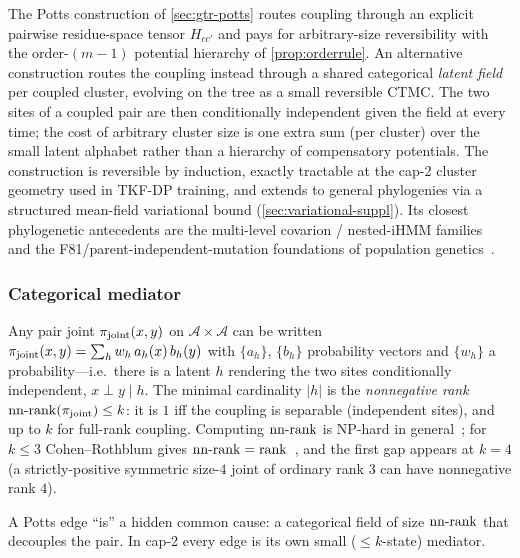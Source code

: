 The Potts construction of \autoref{sec:gtr-potts} routes coupling
through an explicit pairwise residue-space tensor $H_{cc'}$ and pays
for arbitrary-size reversibility with the order-$(m-1)$ potential
hierarchy of \autoref{prop:orderrule}. An alternative construction
routes the coupling instead through a shared categorical
\emph{latent field} per coupled cluster, evolving on the tree as a
small reversible CTMC. The two sites of a coupled pair are then
conditionally independent given the field at every time; the cost
of arbitrary cluster size is one extra sum (per cluster) over the
small latent alphabet rather than a hierarchy of compensatory
potentials. The construction is reversible by induction, exactly
tractable at the cap-2 cluster geometry used in TKF-DP training,
and extends to general phylogenies via a structured mean-field
variational bound (\autoref{sec:variational-suppl}). Its closest
phylogenetic antecedents are the multi-level covarion / nested-iHMM
families~\citep{tuffleysteel1998, Beal2002, TehJordanBealBlei2006}
and the F81/parent-independent-mutation foundations of population
genetics~\citep{ewens1972, Kingman1975, Felsenstein81}.

\subsubsection{Categorical mediator}
\label{sec:dynamic-mediator}

\begin{proposition}
\label{prop:mediator}
Any pair joint $\pi_{\mathrm{joint}}(x,y)$ on $\mathcal A\times\mathcal A$ can be
written $\pi_{\mathrm{joint}}(x,y)=\sum_{h} w_h\,a_h(x)\,b_h(y)$ with $\{a_h\}$,
$\{b_h\}$ probability vectors and $\{w_h\}$ a probability---i.e.\
there is a latent $h$ rendering the two sites conditionally
independent, $x\perp y\mid h$. The minimal cardinality $|h|$ is the
\emph{nonnegative rank} $\mathrm{nn\text{-}rank}(\pi_{\mathrm{joint}})\le k$: it is $1$ iff the
coupling is separable (independent sites), and up to $k$ for
full-rank coupling. Computing $\mathrm{nn\text{-}rank}$ is NP-hard in
general~\citep{Vavasis2009}; for $k\le 3$ Cohen--Rothblum gives
$\mathrm{nn\text{-}rank}=\operatorname{rank}$~\citep{CohenRothblum1993}, and the
first gap appears at $k=4$ (a strictly-positive symmetric size-$4$
joint of ordinary rank $3$ can have nonnegative rank $4$).
\end{proposition}

A Potts edge ``is'' a hidden common cause: a categorical field of
size $\mathrm{nn\text{-}rank}$ that decouples the pair. In cap-2 every edge is its
own small ($\le k$-state) mediator.

